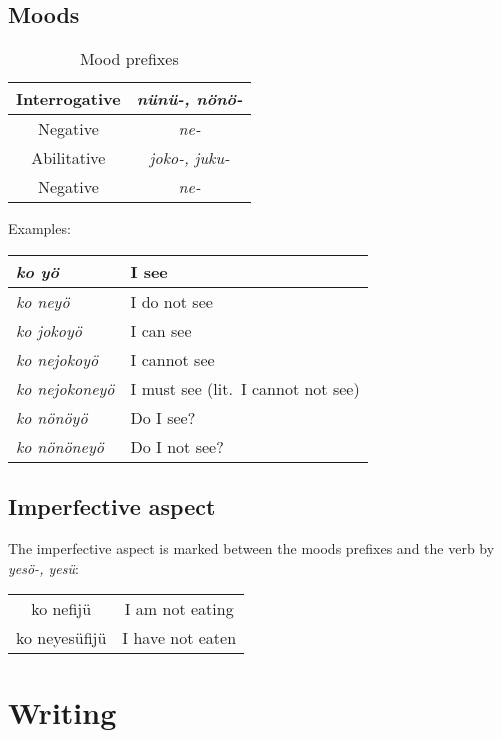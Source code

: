 \documentclass[a4paper]{article}
\begin{document}
\subsection{Moods}

\begin{table}[H]
\begin{tabular}{c | c}
Interrogative & \emph{n\"un\"u-, n\"on\"o-} \\
\hline
Negative & \emph{ne-} \\
\hline
Abilitative & \emph{joko-, juku-} \\
\hline
Negative & \emph{ne-}
\end{tabular}
\caption{Mood prefixes}
\end{table}

Examples:
\begin{table}[H]
\begin{tabular}{l | l}
\emph{ko y\"o} & I see \\
\hline
\emph{ko ney\"o} & I do not see \\
\hline
\emph{ko jokoy\"o} & I can see \\
\hline
\emph{ko nejokoy\"o} & I cannot see \\
\hline
\emph{ko nejokoney\"o} & I must see (lit.\ I cannot not see) \\
\hline
\emph{ko n\"on\"oy\"o} & Do I see? \\
\hline
\emph{ko n\"on\"oney\"o} & Do I not see?
\end{tabular}
\end{table}

\subsection{Imperfective aspect}

The imperfective aspect is marked between the moods prefixes and the verb by
\emph{yes\"o-, yes\"u}: 
\begin{tabular}{c | c}
ko nefij\"u & I am not eating \\
ko neyes\"ufij\"u & I have not eaten
\end{tabular} 

\section{Writing}
\end{document}
